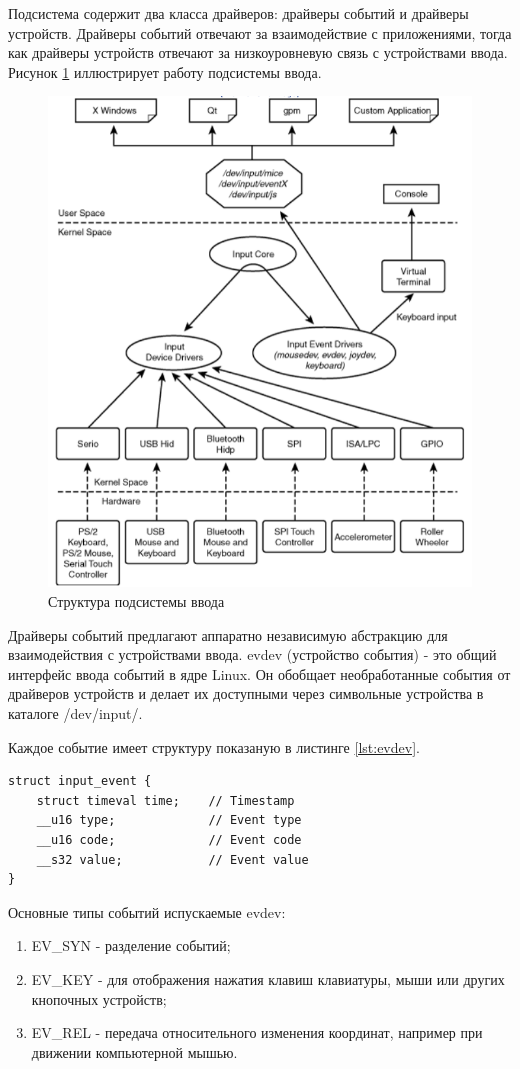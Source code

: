 Подсистема содержит два класса драйверов: драйверы событий и драйверы устройств. 
Драйверы событий отвечают за взаимодействие с приложениями, тогда как драйверы устройств отвечают за низкоуровневую связь с устройствами ввода. 
Рисунок \ref*{fig:inputsystem} иллюстрирует работу подсистемы ввода.

\begin{figure}[H]
	\centering
	\includegraphics[width=0.7\linewidth]{src/img/input_system}
	\caption{Структура подсистемы ввода}
	\label{fig:inputsystem}
\end{figure}

Драйверы событий предлагают аппаратно независимую абстракцию для взаимодействия с устройствами ввода.
evdev (устройство события) - это общий интерфейс ввода событий в ядре Linux. 
Он обобщает необработанные события от драйверов устройств и делает их доступными через символьные устройства в каталоге /dev/input/. 

Каждое событие имеет структуру показаную в листинге \ref{lst:evdev}.

\begin{lstlisting}[caption=Структура события evdev, label=lst:evdev]
struct input_event {
	struct timeval time; 	// Timestamp
	__u16 type; 			// Event type
	__u16 code;				// Event code
	__s32 value;			// Event value
}
\end{lstlisting}

Основные типы событий испускаемые evdev:
\begin{enumerate}
	\item EV\_SYN - разделение событий;
	\item EV\_KEY - для отображения нажатия клавиш клавиатуры, мыши или других кнопочных устройств;
	\item EV\_REL - передача относительного изменения координат, например при движении компьютерной мышью.
\end{enumerate}




